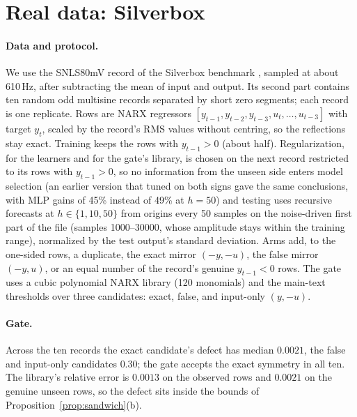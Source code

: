 \section{Real data: Silverbox}\label{app:silverbox}
\paragraph{Data and protocol.} We use the SNLS80mV record of the Silverbox benchmark \citep{wigren2013three}, sampled at about 610\,Hz, after subtracting the mean of input and output. Its second part contains ten random odd multisine records separated by short zero segments; each record is one replicate. Rows are NARX regressors $[y_{t-1},y_{t-2},y_{t-3},u_t,\dots,u_{t-3}]$ with target $y_t$, scaled by the record's RMS values without centring, so the reflections stay exact. Training keeps the rows with $y_{t-1}>0$ (about half). Regularization, for the learners and for the gate's library, is chosen on the next record restricted to its rows with $y_{t-1}>0$, so no information from the unseen side enters model selection (an earlier version that tuned on both signs gave the same conclusions, with MLP gains of 45\% instead of 49\% at $h=50$) and testing uses recursive forecasts at $h\in\{1,10,50\}$ from origins every 50 samples on the noise-driven first part of the file (samples 1000--30000, whose amplitude stays within the training range), normalized by the test output's standard deviation. Arms add, to the one-sided rows, a duplicate, the exact mirror $(-y,-u)$, the false mirror $(-y,u)$, or an equal number of the record's genuine $y_{t-1}<0$ rows. The gate uses a cubic polynomial NARX library (120 monomials) and the main-text thresholds over three candidates: exact, false, and input-only $(y,-u)$.

\paragraph{Gate.} Across the ten records the exact candidate's defect has median $0.0021$, the false and input-only candidates $0.30$; the gate accepts the exact symmetry in all ten. The library's relative error is $0.0013$ on the observed rows and $0.0021$ on the genuine unseen rows, so the defect sits inside the bounds of Proposition~\ref{prop:sandwich}(b).

